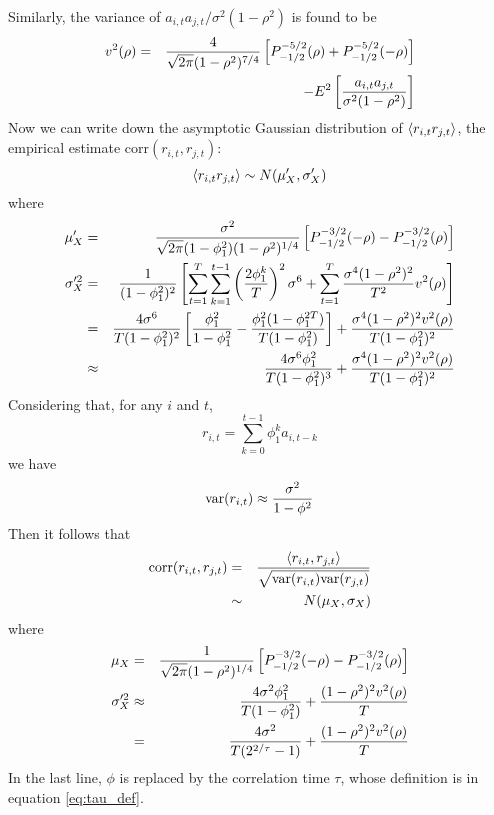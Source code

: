 \documentclass{book}
\begin{document}
Similarly, the variance of $a_{i,t}a_{j,t}/\sigma^2 (1 - \rho^2)$ is
found to be
\begin{eqnarray*}
  v^2(\rho) &=&
  {4 \over \sqrt{2\pi} (1 - \rho^2)^{7/4}} \left[
    P^{-5/2}_{-1/2}(\rho) + P^{-5/2}_{-1/2}(-\rho)
  \right] \\
  && - E^2\left[{a_{i,t}a_{j,t} \over
      \sigma^2 (1 - \rho^2)}\right]
\end{eqnarray*}
Now we can write down the asymptotic Gaussian distribution of
$\langle r_{i,t}r_{j,t}\rangle$, the empirical estimate
$\text{corr}(r_{i,t},r_{j,t})$:
\begin{equation*}
\langle r_{i,t}r_{j,t}\rangle \sim N(\mu'_X, \sigma'_X)
\end{equation*}
where
\begin{eqnarray*}
  \mu'_X &=& {\sigma^2 \over \sqrt{2\pi} (1 - \phi_1^2)(1 -
    \rho^2)^{1/4}} \left[ P^{-3/2}_{-1/2}(-\rho) -
    P^{-3/2}_{-1/2}(\rho)
  \right] \\
  \sigma'^2_X &=& {1 \over (1 - \phi_1^2)^2}\left[
    \sum_{t=1}^T \sum_{k=1}^{t-1} \left(
      2\phi_1^k \over T
    \right)^2 \sigma^6 + \sum_{t=1}^T
    {\sigma^4 (1 - \rho^2)^2 \over T^2} v^2(\rho)
  \right] \\
  &=& {4 \sigma^6 \over T (1 - \phi_1^2)^2} \left[
    {\phi_1^2 \over 1 - \phi_1^2} -
    {\phi_1^2 (1 - \phi_1^{2T}) \over
      T(1 - \phi_1^2)}
  \right] + {\sigma^4 (1 - \rho^2)^2 v^2(\rho) \over
    T (1 - \phi_1^2)^2} \\
  &\approx& {4 \sigma^6 \phi_1^2 \over T (1 - \phi_1^2)^3}
  + {\sigma^4 (1 - \rho^2)^2 v^2(\rho) \over
    T (1 - \phi_1^2)^2}
\end{eqnarray*}
Considering that, for any $i$ and $t$,
\begin{equation*}
  r_{i,t} = \sum_{k=0}^{t-1} \phi_1^k a_{i, t-k}
\end{equation*}
we have
\begin{equation*}
  \text{var}(r_{i,t}) \approx {\sigma^2 \over 1 - \phi^2}
\end{equation*}
Then it follows that
\begin{eqnarray*}
  \text{corr}(r_{i,t}, r_{j,t}) &=&
  {\langle r_{i,t}, r_{j,t}\rangle \over
    \sqrt{\text{var}(r_{i,t})\text{var}(r_{j,t})}} \\
  &\sim& N(\mu_X, \sigma_X)
\end{eqnarray*}
where
\begin{eqnarray*}
  \mu_X &=& {1 \over \sqrt{2\pi} (1 -
    \rho^2)^{1/4}} \left[ P^{-3/2}_{-1/2}(-\rho) -
    P^{-3/2}_{-1/2}(\rho)
  \right] \\
  \sigma'^2_X   &\approx& {4 \sigma^2 \phi_1^2 \over T (1 - \phi_1^2)}
  + {(1 - \rho^2)^2 v^2(\rho) \over T} \\
  &=& {4 \sigma^2 \over T (2^{2/\tau} - 1)}
  + {(1 - \rho^2)^2 v^2(\rho) \over T} \\ 
\end{eqnarray*}
In the last line, $\phi$ is replaced by the correlation time
$\tau$, whose definition is in equation \ref{eq:tau_def}.
\end{document}
